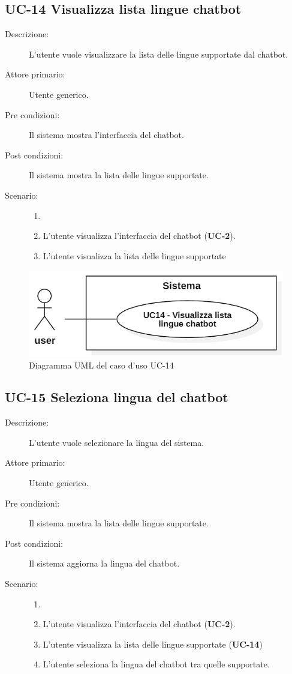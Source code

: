 \subsection{UC-14 Visualizza lista lingue chatbot}
\begin{description}
    \item[Descrizione:] L'utente vuole visualizzare la lista delle lingue supportate dal chatbot.
    \item[Attore primario:] Utente generico.
    \item[Pre condizioni:] Il sistema mostra l'interfaccia del chatbot.
    \item[Post condizioni:] Il sistema mostra la lista delle lingue supportate.
    \item[Scenario:]
    \begin{enumerate}
        \item[]
        \item L'utente visualizza l'interfaccia del chatbot (\textbf{UC-2}).
        \item L'utente visualizza la lista delle lingue supportate
    \end{enumerate}
\end{description}

\begin{figure}[H]
    \centering
    \includegraphics[width=0.8\linewidth]{UC14.png}
    \caption{Diagramma UML del caso d'uso UC-14}
    \label{fig:UC14}
\end{figure}

\subsection{UC-15 Seleziona lingua del chatbot}
\begin{description}
    \item[Descrizione:] L'utente vuole selezionare la lingua del sistema.
    \item[Attore primario:] Utente generico.
    \item[Pre condizioni:] Il sistema mostra la lista delle lingue supportate.
    \item[Post condizioni:] Il sistema aggiorna la lingua del chatbot.
    \item[Scenario:]
    \begin{enumerate}
        \item[] 
        \item L’utente visualizza l'interfaccia del chatbot (\textbf{UC-2}).
        \item L'utente visualizza la lista delle lingue supportate (\textbf{UC-14})
        \item L’utente seleziona la lingua del chatbot tra quelle supportate.
    \end{enumerate}
\end{description}

